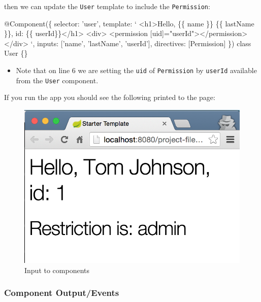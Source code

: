 \documentclass[12pt,]{article}
\newenvironment{Shaded}{}{}
\newcommand{\KeywordTok}[1]{\textcolor[rgb]{0.00,0.00,1.00}{{#1}}}
\newcommand{\StringTok}[1]{\textcolor[rgb]{0.00,0.50,0.50}{{#1}}}
\newcommand{\FunctionTok}[1]{{#1}}
\newcommand{\NormalTok}[1]{{#1}}
\providecommand{\tightlist}{%
  \setlength{\itemsep}{0pt}\setlength{\parskip}{0pt}}
\begin{document}
then we can update the \texttt{User} template to include the
\texttt{Permission}:

\begin{Shaded}
\begin{Highlighting}[numbers=left,,]
\FunctionTok{@Component}\NormalTok{(\{}
  \NormalTok{selector: 'user',}
  \NormalTok{template: `}
  \NormalTok{<h1>Hello, \{\{ name \}\} \{\{ lastName \}\}, id: \{\{ userId\}\}</h1>}
  \NormalTok{<div>}
    \NormalTok{<permission [uid]=}\StringTok{"userId"}\NormalTok{></permission>}
  \NormalTok{</div>}
  \NormalTok{`,}
  \NormalTok{inputs: ['name', 'lastName', 'userId'],}
  \NormalTok{directives: [Permission]}
\NormalTok{\})}
\KeywordTok{class} \NormalTok{User \{\}}
\end{Highlighting}
\end{Shaded}

\begin{itemize}
\tightlist
\item
  Note that on line 6 we are setting the \texttt{uid} of
  \texttt{Permission} by \texttt{userId} available from the
  \texttt{User} component.
\end{itemize}

If you run the app you should see the following printed to the page:

\begin{figure}[htbp]
\centering
\includegraphics{images/input-cmp.png}
\caption{Input to components}
\end{figure}

\subsubsection{Component Output/Events}\label{component-outputevents}
\end{document}
